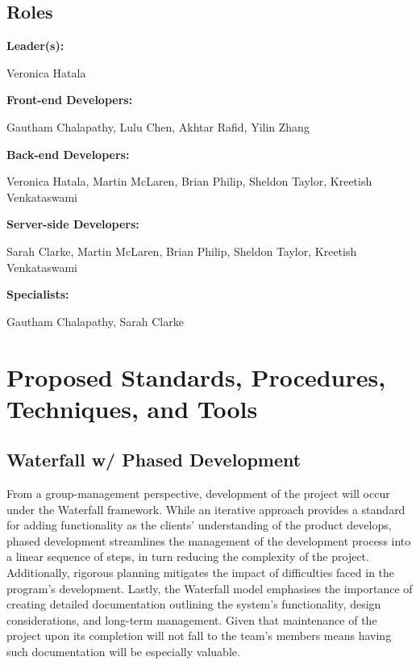 \documentclass[11pt]{article}
\begin{document}
\subsection{Roles}
\textbf{Leader(s):}
\begin{addmargin}[1em]{2em} Veronica Hatala \end{addmargin}\vspace{2mm}
\textbf{Front-end Developers:}
\begin{addmargin}[1em]{2em} Gautham Chalapathy, Lulu Chen, Akhtar Rafid, Yilin Zhang
\end{addmargin}\vspace{2mm}
\textbf{Back-end Developers:}
\begin{addmargin}[1em]{2em} Veronica Hatala, Martin McLaren, Brian Philip, Sheldon Taylor, Kreetish
Venkataswami
\end{addmargin}\vspace{2mm}
\textbf{Server-side Developers:}
\begin{addmargin}[1em]{2em} Sarah Clarke, Martin McLaren, Brian Philip, Sheldon Taylor, Kreetish
Venkataswami
\end{addmargin}\vspace{2mm}
\textbf{Specialists:}
\begin{addmargin}[1em]{2em} Gautham Chalapathy, Sarah Clarke \end{addmargin}\vspace{2mm}

\section{Proposed Standards, Procedures, Techniques, and Tools}
\subsection{Waterfall w/ Phased Development}
From a group-management perspective, development of the project will occur under the Waterfall
framework. While an iterative approach provides a standard for adding functionality as the clients'
understanding of the product develops, phased development streamlines the management of the
development process into a linear sequence of steps, in turn reducing the complexity of the project.
Additionally, rigorous planning mitigates the impact of difficulties faced in the program's
development. Lastly, the Waterfall model emphasises the importance of creating detailed
documentation outlining the system's functionality, design considerations, and long-term management.
Given that maintenance of the project upon its completion will not fall to the team's members means
having such documentation will be especially valuable.
\end{document}
